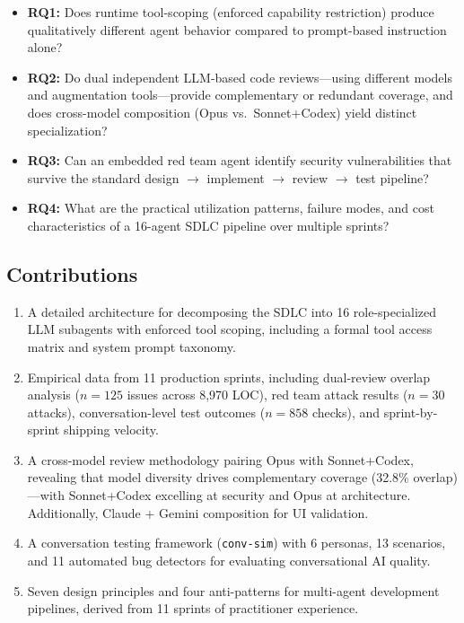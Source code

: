 \documentclass[11pt,a4paper]{article}
\begin{document}
\begin{itemize}[leftmargin=*]
    \item \textbf{RQ1:} Does runtime tool-scoping (enforced capability restriction) produce qualitatively different agent behavior compared to prompt-based instruction alone?
    \item \textbf{RQ2:} Do dual independent LLM-based code reviews---using different models and augmentation tools---provide complementary or redundant coverage, and does cross-model composition (Opus vs.\ Sonnet+Codex) yield distinct specialization?
    \item \textbf{RQ3:} Can an embedded red team agent identify security vulnerabilities that survive the standard design $\rightarrow$ implement $\rightarrow$ review $\rightarrow$ test pipeline?
    \item \textbf{RQ4:} What are the practical utilization patterns, failure modes, and cost characteristics of a 16-agent SDLC pipeline over multiple sprints?
\end{itemize}

\subsection{Contributions}

\begin{enumerate}
    \item A detailed architecture for decomposing the SDLC into 16 role-specialized LLM subagents with enforced tool scoping, including a formal tool access matrix and system prompt taxonomy.
    \item Empirical data from 11 production sprints, including dual-review overlap analysis ($n=125$ issues across 8{,}970 LOC), red team attack results ($n=30$ attacks), conversation-level test outcomes ($n=858$ checks), and sprint-by-sprint shipping velocity.
    \item A cross-model review methodology pairing Opus with Sonnet+Codex, revealing that model diversity drives complementary coverage (32.8\% overlap)---with Sonnet+Codex excelling at security and Opus at architecture. Additionally, Claude + Gemini composition for UI validation.
    \item A conversation testing framework (\texttt{conv-sim}) with 6 personas, 13 scenarios, and 11 automated bug detectors for evaluating conversational AI quality.
    \item Seven design principles and four anti-patterns for multi-agent development pipelines, derived from 11 sprints of practitioner experience.
\end{enumerate}
\end{document}
